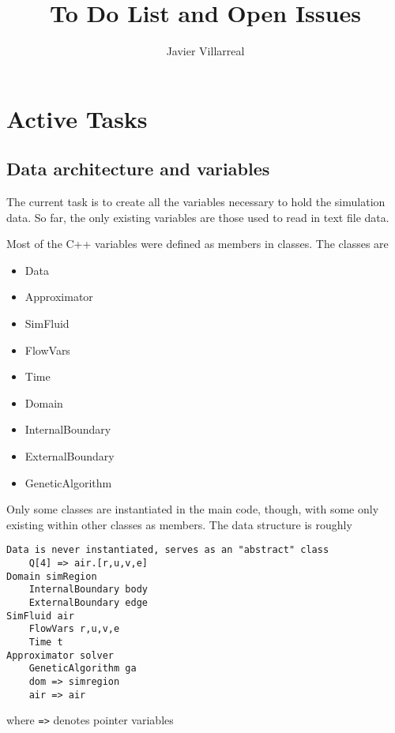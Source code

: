 \documentclass[12pt]{article}
\begin{document}
    \title{To Do List and Open Issues}
    \author{Javier Villarreal}
    \date{}
    \maketitle

    \section{Active Tasks}

    \subsection{Data architecture and variables}
        The current task is to create all the variables necessary to hold the simulation data. So far, the only existing variables are those used to read in text file data.
        
        Most of the C++ variables were defined as members in classes. The classes are
        \begin{multicols}{3}
            \begin{itemize}
                \item Data
                \item Approximator
                \item SimFluid
                \item FlowVars
                \item Time
                \item Domain
                \item InternalBoundary
                \item ExternalBoundary
                \item GeneticAlgorithm
            \end{itemize}
        \end{multicols}
        Only some classes are instantiated in the main code, though, with some only existing within other classes as members. The data structure is roughly
        \begin{verbatim}
Data is never instantiated, serves as an "abstract" class
    Q[4] => air.[r,u,v,e]
Domain simRegion
    InternalBoundary body
    ExternalBoundary edge
SimFluid air
    FlowVars r,u,v,e
    Time t
Approximator solver
    GeneticAlgorithm ga
    dom => simregion
    air => air
        \end{verbatim}
        where \texttt{=>} denotes pointer variables
\end{document}

